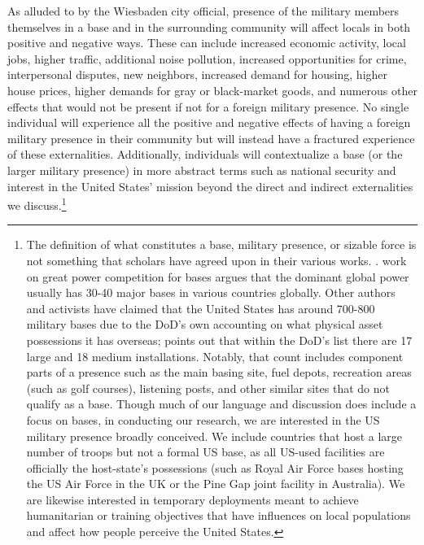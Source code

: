 {As alluded to by the Wiesbaden city official, presence of the military members themselves in a base and in the surrounding community will affect locals in both positive and negative ways. These can include increased economic activity, local jobs, higher traffic, additional noise pollution, increased opportunities for crime, interpersonal disputes, new neighbors, increased demand for housing, higher house prices, higher demands for gray or black-market goods, and numerous other effects that would not be present if not for a foreign military presence. No single individual will experience all the positive and negative effects of having a foreign military presence in their community but will instead have a fractured experience of these externalities. Additionally, individuals will contextualize a base (or the larger military presence) in more abstract terms such as national security and interest in the United States' mission beyond the direct and indirect externalities we discuss.\footnote{The definition of what constitutes a base, military presence, or sizable force is not something that scholars have agreed upon in their various works. \cite{Gillem2007}.  work on great power competition for bases argues that the dominant global power usually has 30-40 major bases in various countries globally. Other authors and activists have claimed that the United States has around 700-800 military bases due to the DoD's own accounting on what physical asset possessions it has overseas;  points out that within the DoD's list there are 17 large and 18 medium installations. Notably, that count includes component parts of a presence such as the main basing site, fuel depots, recreation areas (such as golf courses), listening posts, and other similar sites that do not qualify as a base. Though much of our language and discussion does include a focus on bases, in conducting our research, we are interested in the US military presence broadly conceived. We include countries that host a large number of troops but not a formal US base, as all US-used facilities are officially the host-state's possessions (such as Royal Air Force bases hosting the US Air Force in the UK or the Pine Gap joint facility in Australia). We are likewise interested in temporary deployments meant to achieve humanitarian or training objectives that have influences on local populations and affect how people perceive the United States.} 
	
}
